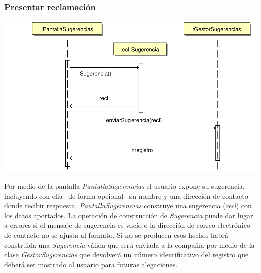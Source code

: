 \documentclass[11pt, a4paper, twoside, titlepage]{article}
\begin{document}
			\subsubsection{Presentar reclamación}
				\begin{center}
					\includegraphics[scale=.7]{diseno/diagramas/presentarreclamacion.pdf}
				\end{center}

				Por medio de la pantalla {\itshape PantallaSugerencias} el usuario expone su sugerencia, incluyendo con ella --de forma opcional-- su nombre y una dirección de contacto donde recibir respuesta. {\itshape PantallaSugerencias} construye una sugerencia ({\itshape recl}) con los datos aportados. La operación de construcción de {\itshape Sugerencia} puede dar lugar a errores si el mensaje de sugerencia es vacío o la dirección de correo electrónico de contacto no se ajusta al formato. Si no se producen esos hechos habrá construida una {\itshape Sugerencia} válida que será enviada a la compañía por medio de la clase {\itshape GestorSugerencias} que devolverá un número identificativo del registro que deberá ser mostrado al usuario para futuras alegaciones.
\end{document}
